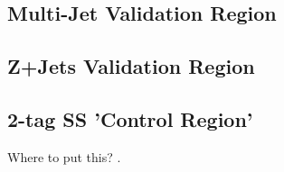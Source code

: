 
\subsection{Multi-Jet Validation Region}

\subsection{Z+Jets Validation Region}

\subsection{2-tag SS 'Control Region'}

Where to put
this? \label{sec:app_additional_figures}\label{app:graphical_illustration_copula_model}.

